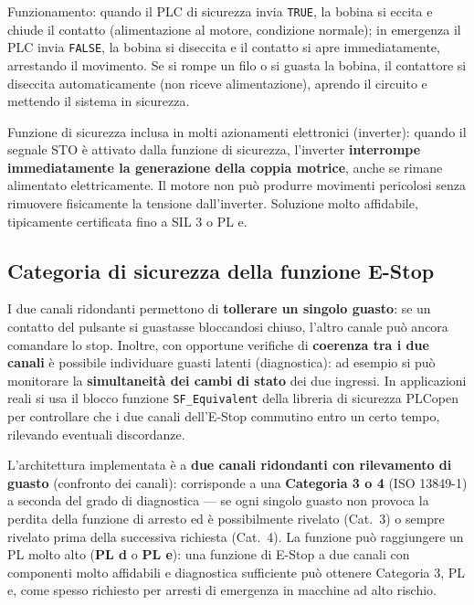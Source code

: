 Funzionamento: quando il PLC di sicurezza invia \texttt{TRUE}, la bobina si eccita e chiude il contatto (alimentazione al motore, condizione normale); in emergenza il PLC invia \texttt{FALSE}, la bobina si diseccita e il contatto si apre immediatamente, arrestando il movimento. Se si rompe un filo o si guasta la bobina, il contattore si diseccita automaticamente (non riceve alimentazione), aprendo il circuito e mettendo il sistema in sicurezza.

\begin{defn}
Funzione di sicurezza inclusa in molti azionamenti elettronici (inverter): quando il segnale STO è attivato dalla funzione di sicurezza, l'inverter \textbf{interrompe immediatamente la generazione della coppia motrice}, anche se rimane alimentato elettricamente. Il motore non può produrre movimenti pericolosi senza rimuovere fisicamente la tensione dall'inverter. Soluzione molto affidabile, tipicamente certificata fino a SIL 3 o PL e.
\end{defn}

\subsection{Categoria di sicurezza della funzione E-Stop}
I due canali ridondanti permettono di \textbf{tollerare un singolo guasto}: se un contatto del pulsante si guastasse bloccandosi chiuso, l'altro canale può ancora comandare lo stop. Inoltre, con opportune verifiche di \textbf{coerenza tra i due canali} è possibile individuare guasti latenti (diagnostica): ad esempio si può monitorare la \textbf{simultaneità dei cambi di stato} dei due ingressi. In applicazioni reali si usa il blocco funzione \texttt{SF\_Equivalent} della libreria di sicurezza PLCopen per controllare che i due canali dell'E-Stop commutino entro un certo tempo, rilevando eventuali discordanze.

L'architettura implementata è a \textbf{due canali ridondanti con rilevamento di guasto} (confronto dei canali): corrisponde a una \textbf{Categoria 3 o 4} (ISO 13849-1) a seconda del grado di diagnostica — se ogni singolo guasto non provoca la perdita della funzione di arresto ed è possibilmente rivelato (Cat.\ 3) o sempre rivelato prima della successiva richiesta (Cat.\ 4). La funzione può raggiungere un PL molto alto (\textbf{PL d} o \textbf{PL e}): una funzione di E-Stop a due canali con componenti molto affidabili e diagnostica sufficiente può ottenere Categoria 3, PL e, come spesso richiesto per arresti di emergenza in macchine ad alto rischio.

